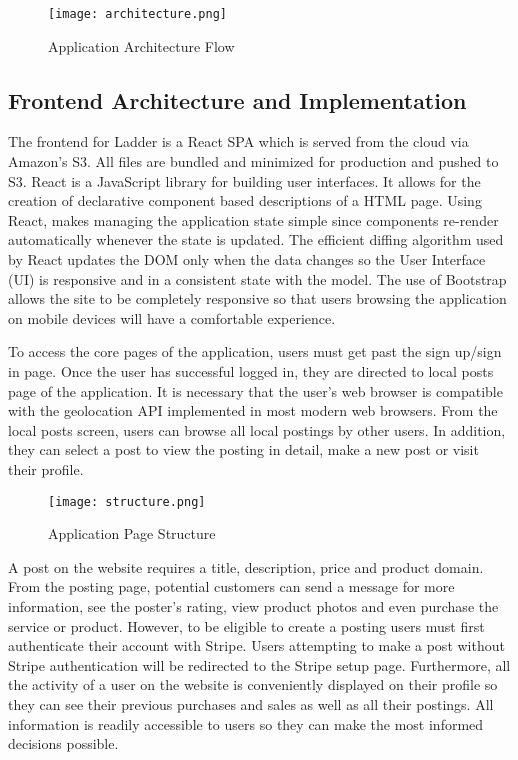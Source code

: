 \documentclass[conference]{IEEEtran}
\begin{document}
\begin{figure}[htbp]
\centerline{\texttt{[image: architecture.png]}}
\caption{Application Architecture Flow}
\label{fig:architecture}
\end{figure}

\subsection{Frontend Architecture and Implementation}
The frontend for Ladder is a React SPA which is served from the cloud via Amazon's S3. All files are bundled and minimized for production and pushed to S3. React is a JavaScript library for building user interfaces. It allows for the creation of declarative component based descriptions of a HTML page. Using React, makes managing the application state simple since components re-render automatically whenever the state is updated. The efficient diffing algorithm used by React updates the DOM only when the data changes so the User Interface (UI) is responsive and in a consistent state with the model. The use of Bootstrap allows the site to be completely responsive so that users browsing the application on mobile devices will have a comfortable experience.

To access the core pages of the application, users must get past the sign up/sign in page. Once the user has successful logged in, they are directed to local posts page of the application. It is necessary that the user's web browser is compatible with the geolocation API implemented in most modern web browsers. From the local posts screen, users can browse all local postings by other users. In addition, they can select a post to view the posting in detail, make a new post or visit their profile. 

\begin{figure}[htbp]
\centerline{\texttt{[image: structure.png]}}
\caption{Application Page Structure}
\label{fig:structure}
\end{figure}

A post on the website requires a title, description, price and product domain. From the posting page, potential customers can send a message for more information, see the poster's rating, view product photos and even purchase the service or product. However, to be eligible to create a posting users must first authenticate their account with Stripe. Users attempting to make a post without Stripe authentication will be redirected to the Stripe setup page. Furthermore, all the activity of a user on the website is conveniently displayed on their profile so they can see their previous purchases and sales as well as all their postings. All information is readily accessible to users so they can make the most informed decisions possible.
\end{document}
